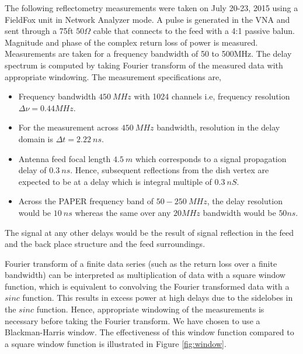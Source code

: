 \documentclass[12pt,preprint]{aastex}
\begin{document}
The following reflectometry measurements were taken on July 20-23, 2015 using a
FieldFox unit in Network Analyzer mode. A pulse is generated in the VNA
and sent through a 75ft $50\Omega$ cable that connects to the feed with a 4:1
passive balun. Magnitude and phase of the complex return loss of power is measured.
Measurements are taken for a frequency bandwidth of 50 to 500MHz. The delay spectrum is computed by taking Fourier transform of the measured data with appropriate windowing. The measurement specifications are, 

\begin{itemize}
\item
Frequency bandwidth $450~MHz$ with 1024 channels i.e, frequency resolution $\Delta \nu = 0.44MHz$.
\item
For the measurement across $450~MHz$ bandwidth, resolution in the delay domain is $\Delta t = 2.22~ns$.
\item
Antenna feed focal length $4.5~m$ which corresponds to a signal propagation delay of $0.3~ns$. Hence, subsequent reflections from the dish vertex are expected to be at a delay which is integral multiple of $0.3~nS$. 
\item
Across the PAPER frequency band of $50 - 250~MHz$, the delay resolution would be $10~ns$ whereas the same over any $20MHz$ bandwidth would be $50ns$.
\end{itemize} 

The signal at any other delays would be the result of signal reflection in the feed and the back place structure and the feed surroundings. 
 
Fourier transform of a finite data series (such as the return loss over a finite bandwidth) can be interpreted as multiplication of data with a square window function, which is equivalent to convolving the Fourier transformed data with a $sinc$ function. This results in excess power at high delays due to the sidelobes in the $sinc$ function. Hence, appropriate windowing of the measurements is necessary before taking the Fourier transform. We have chosen to use a Blackman-Harris window. The effectiveness of this window function compared to a square window function is illustrated in Figure \ref{fig:window}.
\end{document}
